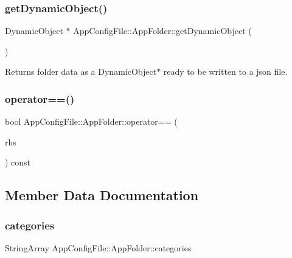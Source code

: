 \subsubsection{\texorpdfstring{get\+Dynamic\+Object()}{getDynamicObject()}}
{\footnotesize\ttfamily Dynamic\+Object $\ast$ App\+Config\+File\+::\+App\+Folder\+::get\+Dynamic\+Object (\begin{DoxyParamCaption}{ }\end{DoxyParamCaption})}

\begin{DoxyReturn}{Returns}
folder data as a Dynamic\+Object$\ast$ ready to be written to a json file. 
\end{DoxyReturn}
\mbox{\label{structAppConfigFile_1_1AppFolder_a8000c200e25a1af90807fb00902d8c63}} 
\subsubsection{\texorpdfstring{operator==()}{operator==()}}
{\footnotesize\ttfamily bool App\+Config\+File\+::\+App\+Folder\+::operator== (\begin{DoxyParamCaption}\item[{const \mbox{\hyperlink{structAppConfigFile_1_1AppFolder}{App\+Folder}} \&}]{rhs }\end{DoxyParamCaption}) const}



\subsection{Member Data Documentation}
\mbox{\label{structAppConfigFile_1_1AppFolder_a8ab88b3fc73a717add1b57c1f2619ec4}} 
\subsubsection{\texorpdfstring{categories}{categories}}
{\footnotesize\ttfamily String\+Array App\+Config\+File\+::\+App\+Folder\+::categories}

